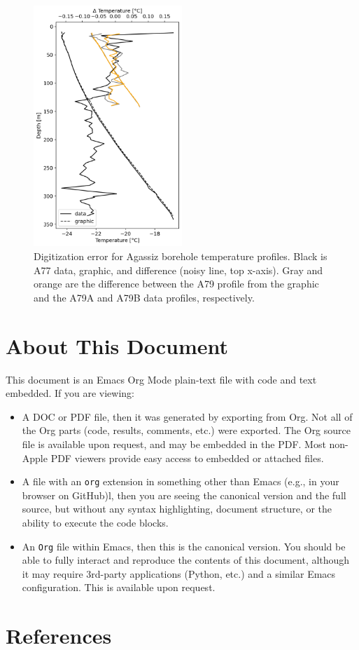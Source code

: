 \documentclass[article,a4paper,times,11pt,twoside]{article}
\begin{document}
\begin{figure}[!h]
\centering
\includegraphics[width=0.5\textwidth]{./fig/agassiz_diff.png}
\caption{\label{fig:err_agassiz}Digitization error for Agassiz borehole temperature profiles. Black is A77 data, graphic, and difference (noisy line, top x-axis). Gray and orange are the difference between the \textcite{clarke_1987_wind} A79 profile from the graphic and the A79A and A79B data profiles, respectively.}
\end{figure}

\clearpage
\section{About This Document}
\label{sec:org5140f93}
This document is an Emacs Org Mode plain-text file with code and text embedded. If you are viewing:
\begin{itemize}
\item A DOC or PDF file, then it was generated by exporting from Org. Not all of the Org parts (code, results, comments, etc.) were exported. The Org source file is available upon request, and may be embedded in the PDF. Most non-Apple PDF viewers provide easy access to embedded or attached files.
\item A file with an \texttt{org} extension in something other than Emacs (e.g., in your browser on GitHub)l, then you are seeing the canonical version and the full source, but without any syntax highlighting, document structure, or the ability to execute the code blocks.
\item An \texttt{Org} file within Emacs, then this is the canonical version. You should be able to fully interact and reproduce the contents of this document, although it may require 3rd-party applications (Python, etc.) and a similar Emacs configuration. This is available upon request.
\end{itemize}

\clearpage
\section{References}
\label{sec:orgb18e392}
\printbibliography[heading=none]
\end{document}
